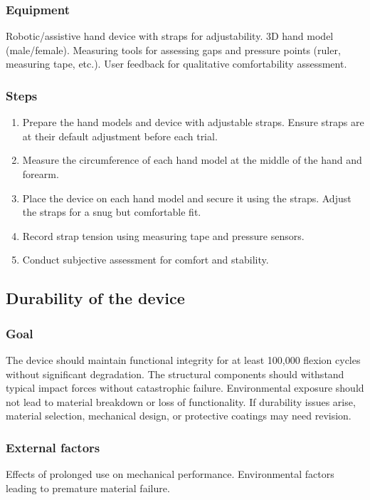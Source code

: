 \documentclass{article}
\begin{document}
\subsubsection{Equipment} Robotic/assistive hand device with straps for adjustability. 3D hand model (male/female). Measuring tools for assessing gaps and pressure points (ruler, measuring tape, etc.). User feedback for qualitative comfortability assessment.

\subsubsection{Steps}
\begin{enumerate}
    \item Prepare the hand models and device with adjustable straps. Ensure straps are at their default adjustment before each trial.
    \item Measure the circumference of each hand model at the middle of the hand and forearm.
    \item Place the device on each hand model and secure it using the straps. Adjust the straps for a snug but comfortable fit.
    \item Record strap tension using measuring tape and pressure sensors.
    \item Conduct subjective assessment for comfort and stability.
\end{enumerate}

\subsection{Durability of the device}

\subsubsection{Goal} The device should maintain functional integrity for at least 100,000 flexion cycles without significant degradation. The structural components should withstand typical impact forces without catastrophic failure. Environmental exposure should not lead to material breakdown or loss of functionality. If durability issues arise, material selection, mechanical design, or protective coatings may need revision.

\subsubsection{External factors} Effects of prolonged use on mechanical performance. Environmental factors leading to premature material failure.
\end{document}
